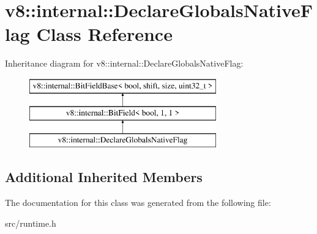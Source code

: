 \hypertarget{classv8_1_1internal_1_1_declare_globals_native_flag}{}\section{v8\+:\+:internal\+:\+:Declare\+Globals\+Native\+Flag Class Reference}
\label{classv8_1_1internal_1_1_declare_globals_native_flag}
Inheritance diagram for v8\+:\+:internal\+:\+:Declare\+Globals\+Native\+Flag\+:\begin{figure}[H]
\begin{center}
\leavevmode
\includegraphics[height=3.000000cm]{classv8_1_1internal_1_1_declare_globals_native_flag}
\end{center}
\end{figure}
\subsection*{Additional Inherited Members}


The documentation for this class was generated from the following file\+:\begin{DoxyCompactItemize}
\item 
src/runtime.\+h\end{DoxyCompactItemize}
